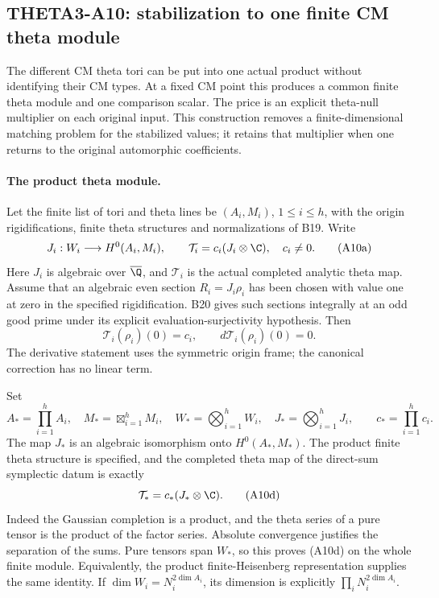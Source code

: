 \subsection{THETA3-A10: stabilization to one finite CM theta module}
\label{A10}

The different CM theta tori can be put into one actual product
without identifying their CM types.  At a fixed CM point this
produces a common finite theta module and one comparison scalar.
The price is an explicit theta-null multiplier on each original
input.  This construction removes a finite-dimensional matching
problem for the stabilized values; it retains that multiplier
when one returns to the original automorphic coefficients.

\paragraph{The product theta module.}
Let the finite list of tori and theta lines be
$(A_i,M_i)$, $1\leq i\leq h$, with the origin rigidifications,
finite theta structures and normalizations of B19.  Write
\[
 J_i:W_i\longrightarrow H^0(A_i,M_i),\qquad
 \mathcal T_i=c_i(J_i\otimes\C),\quad c_i\ne0.
 \tag{A10a}
\]
Here $J_i$ is algebraic over $\overline\Q$, and
$\mathcal T_i$ is the actual completed analytic theta map.
Assume that an algebraic even section $R_i=J_i\rho_i$ has
been chosen with value one at zero in the specified
rigidification.  B20 gives such sections integrally at an
odd good prime under its explicit evaluation-surjectivity
hypothesis.  Then
\[
 \mathcal T_i(\rho_i)(0)=c_i,
       \qquad d\mathcal T_i(\rho_i)(0)=0.
 \tag{A10b}
\]
The derivative statement uses the symmetric origin frame;
the canonical correction has no linear term.

Set
\[
 A_* =\prod_{i=1}^h A_i,\quad
 M_* =\boxtimes_{i=1}^h M_i,\quad
 W_* =\bigotimes_{i=1}^h W_i,\quad
 J_* =\bigotimes_{i=1}^hJ_i,
 \qquad c_* =\prod_{i=1}^h c_i.
 \tag{A10c}
\]
The map $J_*$ is an algebraic isomorphism onto
$H^0(A_*,M_*)$.  The product finite theta structure is
specified, and the completed theta map of the direct-sum
symplectic datum is exactly
\[
                    \mathcal T_*=c_*(J_*\otimes\C).
 \tag{A10d}
\]
Indeed the Gaussian completion is a product, and the theta
series of a pure tensor is the product of the factor series.
Absolute convergence justifies the separation of the sums.
Pure tensors span $W_*$, so this proves (A10d) on the whole
finite module.  Equivalently, the product finite-Heisenberg
representation supplies the same identity.  If
$\dim W_i=N_i^{2\dim A_i}$, its dimension is explicitly
$\prod_iN_i^{2\dim A_i}$.


